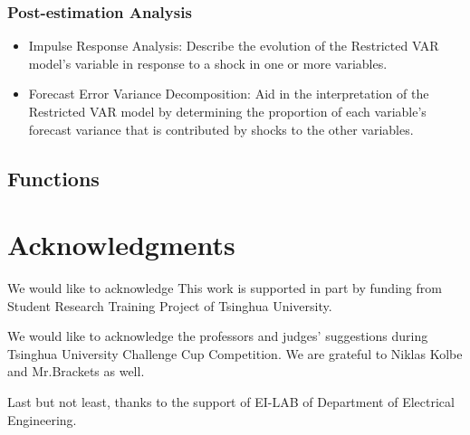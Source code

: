 \documentclass[10pt]{article}
\numberwithin{equation}{section}
\numberwithin{table}{section}
\numberwithin{figure}{section}
\begin{document}
\subsubsection{Post-estimation Analysis}
\begin{itemize}
  \item Impulse Response Analysis: Describe the evolution of the Restricted VAR model’s variable in response to a shock in one or more variables.
  \item Forecast Error Variance Decomposition: Aid in the interpretation of the Restricted VAR model by determining the proportion of each variable’s forecast variance that is contributed by shocks to the other variables.
\end{itemize}




\subsection{Functions}



\newpage
\section{Acknowledgments} \label{sec:thanks}

We would like to acknowledge 
This work is supported in part by funding from Student Research Training Project of Tsinghua University.

We would like to acknowledge the professors and judges' suggestions during Tsinghua University Challenge Cup Competition. We are grateful to Niklas Kolbe and Mr.Brackets as well.

Last but not least, thanks to the support of EI-LAB of Department of Electrical Engineering.
\end{document}
